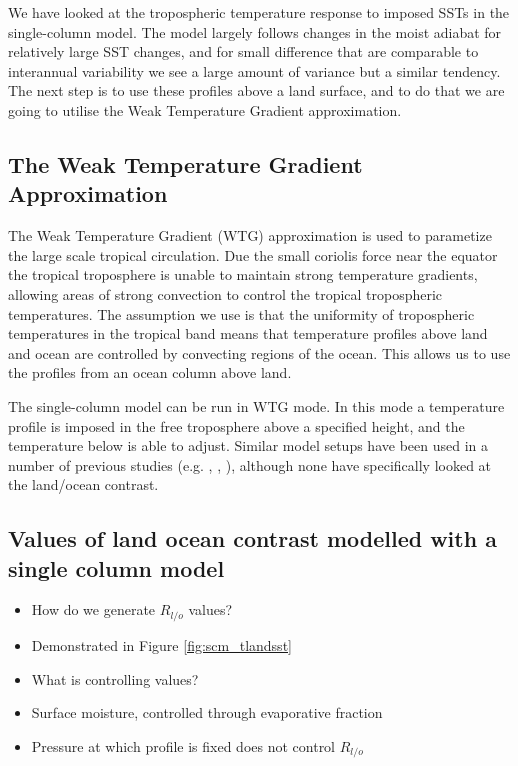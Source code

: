 We have looked at the tropospheric temperature response to imposed SSTs in the 
single-column model. The model largely follows changes in the moist adiabat for 
relatively large SST changes, and for small difference that are comparable to 
interannual variability we see a large amount of variance but a similar 
tendency. The next step is to use these profiles above a land surface, and to do 
that we are going to utilise the Weak Temperature Gradient approximation.

\subsection{The Weak Temperature Gradient Approximation}
The Weak Temperature Gradient (WTG) approximation is used to parametize the 
large scale tropical circulation. Due the small coriolis force near the equator 
the tropical troposphere is unable to maintain strong temperature gradients, 
allowing areas of strong convection to control the tropical tropospheric 
temperatures.  The assumption we use is that the uniformity of tropospheric 
temperatures in the tropical band means that temperature profiles above land and 
ocean are controlled by convecting regions of the ocean. This allows us to use 
the profiles from an ocean column above land.

The single-column model can be run in WTG mode. In this mode a temperature 
profile is imposed in the free troposphere above a specified height, and the 
temperature below is able to adjust. Similar model setups have been used in a 
number of previous studies (e.g. \citet{Sobel2000}, \citet{Lintner2005}, 
\citet{Ramsay2011}), although none have specifically looked at the land/ocean 
contrast.

\subsection{Values of land ocean contrast modelled with a single column model}
\label{sec:scmrlo}
\begin{itemize}
	\item How do we generate $R_{l/o}$ values?
	\item Demonstrated in Figure \ref{fig:scm_tlandsst}
	\item What is controlling values?
	\item Surface moisture, controlled through evaporative fraction
	\item Pressure at which profile is fixed does not control $R_{l/o}$
\end{itemize}

